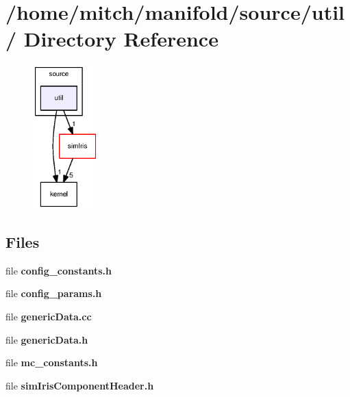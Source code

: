 \section{/home/mitch/manifold/source/util/ Directory Reference}
\label{dir_5d7edf4c3f838d0513c8f183207b8842}


\nopagebreak
\begin{figure}[H]
\begin{center}
\leavevmode
\includegraphics[width=71pt]{dir_5d7edf4c3f838d0513c8f183207b8842_dep}
\end{center}
\end{figure}
\subsection*{Files}
\begin{CompactItemize}
\item 
file {\bf config\_\-constants.h}
\item 
file {\bf config\_\-params.h}
\item 
file {\bf genericData.cc}
\item 
file {\bf genericData.h}
\item 
file {\bf mc\_\-constants.h}
\item 
file {\bf simIrisComponentHeader.h}
\end{CompactItemize}
